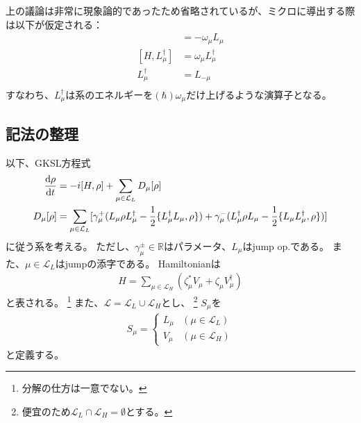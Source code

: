 \documentclass[a4paper,11pt]{jsarticle}
\numberwithin{equation}{section}
\begin{document}
上の議論は非常に現象論的であったため省略されているが、ミクロに導出する際は以下が仮定される：
\begin{align}
    [H,L_{\mu}] &= -\omega_{\mu} L_{\mu} \\
    [H,L_{\mu}^{\dagger}] &= \omega_{\mu} L_{\mu}^{\dagger} \\
    L_{\mu}^{\dagger} &= L_{-\mu} \\
\end{align}
すなわち、$L_{\mu}^\dagger$は系のエネルギーを$(\hbar)\omega_{\mu}$だけ上げるような演算子となる。

\subsection{記法の整理}
以下、GKSL方程式
\begin{align}
    \dv{\rho}{t} &= -i[H,\rho] + \sum_{\mu \in \mathcal{L}_{L}}D_{\mu}[\rho] \\
    D_{\mu}[\rho] &= \sum_{\mu \in \mathcal{L}_{L}} [\gamma_{\mu}^{+} (L_{\mu} \rho L_{\mu}^{\dagger} - \frac{1}{2} \{L_{\mu}^{\dagger} L_{\mu}, \rho\}) 
    + \gamma_{\mu}^{-} (L_{\mu}^{\dagger} \rho L_{\mu} - \frac{1}{2} \{L_{\mu} L_{\mu}^{\dagger}, \rho\})]
\end{align}
に従う系を考える。
ただし、$\gamma_{\mu}^{\pm} \in \mathbb{R}$はパラメータ、$L_{\mu}$はjump op.である。
また、$\mu \in \mathcal{L}_{L}$はjumpの添字である。
Hamiltonianは
\begin{align}
    H = \sum_{\mu \in \mathcal{L}_{H}} (\zeta^*_{\mu} V_{\mu} + \zeta_{\mu} V_{\mu}^{\dagger})
\end{align}
と表される。
\footnote{
    分解の仕方は一意でない。
}
また、$\mathcal{L} = \mathcal{L}_{L} \cup \mathcal{L}_{H}$とし、
\footnote{
    便宜のため$\mathcal{L}_{L} \cap \mathcal{L}_{H} = \emptyset$とする。
}
$S_{\mu}$を
\begin{align}
    S_{\mu} =
    \begin{cases}
        L_{\mu} & (\mu \in \mathcal{L}_{L}) \\
        V_{\mu} & (\mu \in \mathcal{L}_{H})
    \end{cases}
\end{align}
と定義する。
\end{document}
